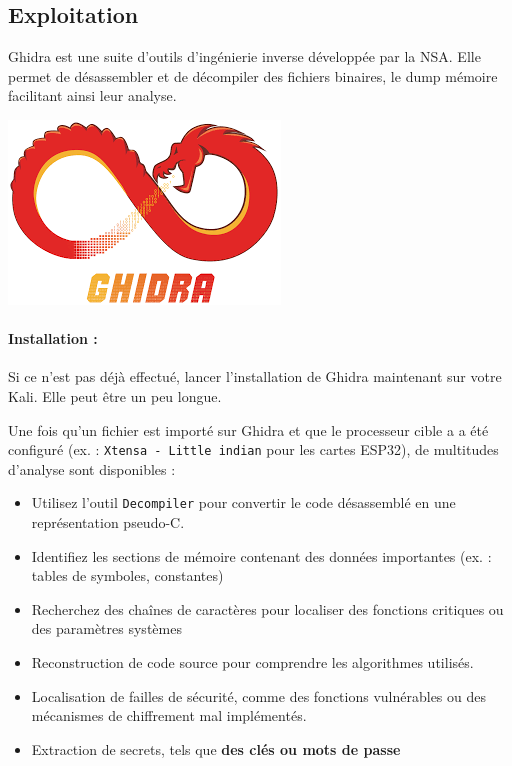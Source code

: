 \documentclass[french, 12pt]{article}%
\newcommand{\itemE}{\item[$\bullet$]}
\newcommand{\titreencadre}{Titre}
\newenvironment{encadre}[1]{\renewcommand{\titreencadre}{#1}
	\begin{mdframed}[style=encadrestyle]
	\vspace{0.5\baselineskip}
	}{%
	\end{mdframed}}
\begin{document}
\subsection{Exploitation }


\begin{minipage}{0.6\linewidth}

\begin{encadre}{Ghidra}
Ghidra est une suite d'outils d'ingénierie inverse développée par la NSA. Elle permet de désassembler et de décompiler des fichiers binaires, le dump mémoire facilitant ainsi leur analyse.
\end{encadre}
\end{minipage}
\begin{minipage}{0.35\linewidth}
\begin{center}
\includegraphics[scale=0.4]{./ressource/ghidra.png}
\end{center}
\end{minipage}

\paragraph{Installation : } Si ce n'est pas déjà effectué, lancer l'installation de Ghidra maintenant sur votre Kali. Elle peut être un peu longue.
 
Une fois qu'un fichier est importé sur Ghidra et que le processeur cible a a été configuré (ex. : \texttt{Xtensa - Little indian} pour les cartes ESP32), de multitudes d'analyse sont disponibles : 
\begin{itemize}
\itemE Utilisez l'outil \texttt{Decompiler} pour convertir le code désassemblé en une représentation pseudo-C.
\itemE Identifiez les sections de mémoire contenant des données importantes (ex. : tables de symboles, constantes)
\itemE Recherchez des chaînes de caractères pour localiser des fonctions critiques ou des paramètres systèmes
\itemE Reconstruction de code source pour comprendre les algorithmes utilisés.
\itemE Localisation de failles de sécurité, comme des fonctions vulnérables ou des mécanismes de chiffrement mal implémentés.
\itemE Extraction de secrets, tels que \textbf{des clés ou mots de passe}
\end{itemize}
\end{document}
